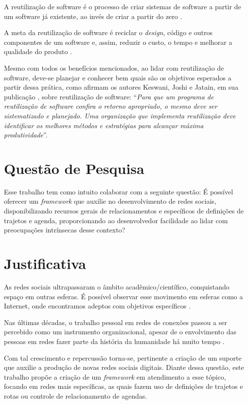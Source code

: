 A reutilização de software é o processo de criar sistemas de software a partir de um software já existente, ao invés de criar a partir do zero \cite{Krueger:1992}.

A meta da reutilização de software é reciclar o \textit{design}, código e outros componentes de um software e, assim, reduzir o custo, o tempo e melhorar a qualidade do produto \cite{Keswani:Joshi:Jatain:2014}.

Mesmo com todos os benefícios mencionados, ao lidar com reutilização de software, deve-se planejar e conhecer bem quais são os objetivos esperados a partir dessa prática, como afirmam os autores Keswani, Joshi e Jatain, em sua publicação  \cite{Keswani:Joshi:Jatain:2014}, sobre reutilização de software: ``\textit{Para que um programa de reutilização de software confira o retorno apropriado, o mesmo deve ser sistematizado e planejado. Uma organização que implementa reutilização deve identificar os melhores métodos e estratégias para alcançar máxima produtividade}''.

\section{Questão de Pesquisa}

Esse trabalho tem como intuito colaborar com a seguinte questão: É possível oferecer um \textit{framework} que auxilie no desenvolvimento de redes sociais, disponibilizando recursos gerais de relacionamentos e específicos de definições de trajetos e agenda, proporcionando ao desenvolvedor facilidade ao lidar com preocupações intrínsecas desse contexto?

\section{Justificativa}

As redes sociais ultrapassaram o âmbito acadêmico/científico, conquistando espaço em outras esferas. É possível observar esse movimento em esferas como a Internet, onde encontramos adeptos com objetivos específicos \cite{Tomae:Alcara:Chiara:2005}.

Nas últimas décadas, o trabalho pessoal em redes de conexões passou a ser percebido como um instrumento organizacional, apesar de o envolvimento das pessoas em redes fazer parte da história da humanidade há muito tempo \cite{Tomae:Alcara:Chiara:2005}.

Com tal crescimento e repercussão torna-se, pertinente a criação de um suporte que auxilie a produção de novas redes sociais digitais. Diante dessa questão, este trabalho propõe a criação de um \textit{framework} em atendimento a esse tópico, focando em redes mais específicas, as quais fazem uso de definições de trajetos e rotas ou controle de relacionamento de agendas.


